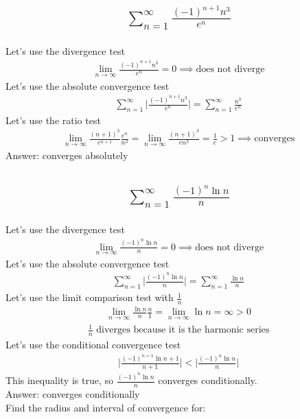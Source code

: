 \documentclass{article}
\begin{document}
\subsection{
	\begin{align*}
		\sum_{n = 1}^{\infty} \frac{(-1)^{n + 1} n^3}{e^n}
	\end{align*}
}
Let's use the divergence test
\begin{align*}
	\lim_{n \to \infty} {\frac{(-1)^{n + 1} n^3}{e^n}} = 0 \implies \text{does not diverge}
\end{align*}
Let's use the absolute convergence test
\begin{align*}
	\sum_{n = 1}^{\infty} \bigg| \frac{(-1)^{n + 1} n^3}{e^n} \bigg| = \sum_{n = 1}^{\infty} \frac{n^3}{e^n}
\end{align*}
Let's use the ratio test
\begin{align*}
	\lim_{n \to \infty} {\frac{(n + 1)^3}{e^{n + 1}} \frac{e^n}{n^3}} = \lim_{n \to \infty} {\frac{(n + 1)^3}{en^3}} = \frac{1}{e} > 1 \implies \text{converges}
\end{align*}
Answer: converges absolutely

\subsection{
	\begin{align*}
		\sum_{n = 1}^{\infty} \frac{(-1)^{n} \ln{n}}{n}
	\end{align*}
}
Let's use the divergence test
\begin{align*}
	\lim_{n \to \infty} {\frac{(-1)^{n} \ln{n}}{n}} = 0 \implies \text{does not diverge}
\end{align*}
Let's use the absolute convergence test
\begin{align*}
	\sum_{n = 1}^{\infty} \bigg| \frac{(-1)^{n} \ln{n}}{n} \bigg| = \sum_{n = 1}^{\infty} \frac{ \ln{n}}{n}
\end{align*}
Let's use the limit comparison test with $\frac{1}{n}$
\begin{align*}
	\lim_{n \to \infty} {\frac{\ln{n}}{n} \frac{n}{1}} = \lim_{n \to \infty} {\ln{n}} = \infty > 0
\end{align*}
\begin{align*}
	\frac{1}{n} \text{ diverges because it is the harmonic series}
\end{align*}
Let's use the conditional convergence test
\begin{align*}
	\bigg| \frac{(-1)^{n = 1} \ln{n + 1}}{n + 1} \bigg| < \bigg| \frac{(-1)^{n} \ln{n}}{n} \bigg|
\end{align*}
This inequality is true, so $\frac{(-1)^{n} \ln{n}}{n}$ converges conditionally. \\[10pt]
Answer: converges conditionally \\[10pt]
Find the radius and interval of convergence for:
\end{document}
